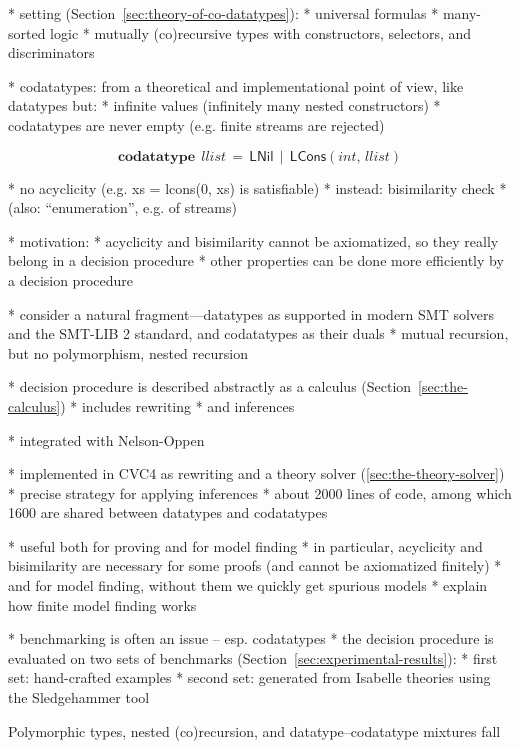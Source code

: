 \documentclass[a4paper,oribibl,envcountsame,draft]{llncs}
\newcommand\keyw[1]{\textbf{#1}}
\newcommand\const[1]{\textsf{#1}}
\newcommand\ty[1]{\textit{#1}}
\begin{document}
  * setting (Section~\ref{sec:theory-of-co-datatypes}):
    * universal formulas
    * many-sorted logic
    * mutually (co)recursive types with constructors, selectors, and
      discriminators

  * codatatypes: from a theoretical and implementational point of view, like
      datatypes but:
    * infinite values (infinitely many nested constructors)
    * codatatypes are never empty (e.g. finite streams are rejected)

\[
      \keyw{codatatype}\; \,\ty{llist} \,=\, \const{LNil} \,\mid\, \const{LCons}(\ty{int},\, \ty{llist})
\]

    * no acyclicity (e.g. xs = lcons(0, xs) is satisfiable)
    * instead: bisimilarity check
    * (also: ``enumeration'', e.g. of streams)

  * motivation:
    * acyclicity and bisimilarity cannot be axiomatized, so they really belong in
      a decision procedure
    * other properties can be done more efficiently by a decision procedure

  * consider a natural fragment---datatypes as supported in modern SMT solvers
    and the SMT-LIB 2 standard, and codatatypes as their duals
    * mutual recursion, but no polymorphism, nested recursion

  * decision procedure is described abstractly as a calculus
    (Section~\ref{sec:the-calculus})
    * includes rewriting
    * and inferences

  * integrated with Nelson-Oppen

  * implemented in CVC4 as rewriting and a theory solver
    (\ref{sec:the-theory-solver})
    * precise strategy for applying inferences
    * about 2000 lines of code, among which 1600 are shared between datatypes
      and codatatypes

  * useful both for proving and for model finding
    * in particular, acyclicity and bisimilarity are necessary for some proofs
      (and cannot be axiomatized finitely)
    * and for model finding, without them we quickly get spurious models
    * explain how finite model finding works


  * benchmarking is often an issue -- esp. codatatypes
  * the decision procedure is evaluated on two sets of benchmarks
    (Section~\ref{sec:experimental-results}):
    * first set: hand-crafted examples
    * second set: generated from Isabelle theories using the Sledgehammer tool

Polymorphic types, nested (co)recursion, and datatype--codatatype mixtures fall
\end{document}
